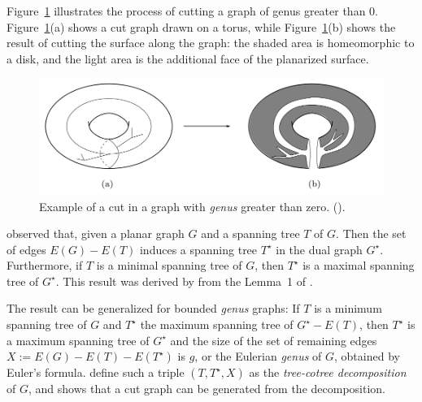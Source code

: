 Figure~\ref{fig:mortar5} illustrates the process of cutting a graph of genus greater than 0.  Figure~\ref{fig:mortar5}(a) shows a cut graph drawn on a torus, while Figure~\ref{fig:mortar5}(b) shows the result of cutting the surface along the graph: the shaded area is homeomorphic to a disk, and the light area is the additional face of the planarized surface.

\begin{figure}[h]
    \centering
    \includegraphics[scale=0.45]{imgs/mortar5.png}
    \caption {Example of a cut in a graph with \textit{genus} greater than zero. (\cite{Borradaile2012}).}
    \label{fig:mortar5}
\end{figure}


\cite{Borradaile2012} observed that, given a planar graph \(G\) and a spanning tree \(T\) of \(G\). Then the set of edges \(E(G) - E(T)\) induces a spanning tree \(T^{\star}\) in the dual graph \(G^{\star}\). Furthermore, if \(T\) is a minimal spanning tree of \(G\), then \(T^{\star}\) is a maximal spanning tree of \(G^{\star}\). This result was derived by \citeauthor{Borradaile2012} from the Lemma~1 of \cite{EPPSTEIN199233}.

The result can be generalized for bounded \textit{genus} graphs: If \(T\) is a minimum spanning tree of \(G\) and \(T^{\star}\) the maximum spanning tree of \(G^{\star} - E(T)\), then \(T^{\star}\) is a maximum spanning tree of \(G^{\star}\) and the size of the set of remaining edges \(X := E(G) - E(T) - E(T^{\star})\) is \(g\), or the Eulerian \textit{genus} of \(G\), obtained by Euler's formula. \cite{Eppstein} define such a triple \((T, T^{\star}, X)\) as the \textit{tree-cotree decomposition} of \(G\), and shows that a cut graph can be generated from the decomposition.

